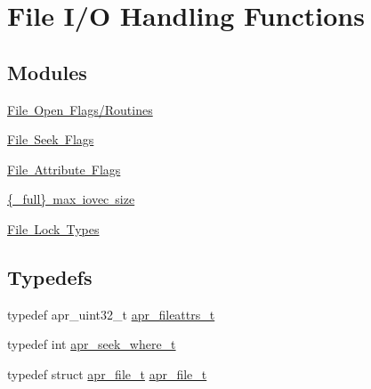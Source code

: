 \hypertarget{group__apr__file__io}{}\section{File I/O Handling Functions}
\label{group__apr__file__io}
\subsection*{Modules}
\begin{DoxyCompactItemize}
\item 
\mbox{\hyperlink{group__apr__file__open__flags}{File Open Flags/\+Routines}}
\item 
\mbox{\hyperlink{group__apr__file__seek__flags}{File Seek Flags}}
\item 
\mbox{\hyperlink{group__apr__file__attrs__set__flags}{File Attribute Flags}}
\item 
\mbox{\hyperlink{group__apr__file__writev}{\{\+\_\+full\} max iovec size}}
\item 
\mbox{\hyperlink{group__apr__file__lock__types}{File Lock Types}}
\end{DoxyCompactItemize}
\subsection*{Typedefs}
\begin{DoxyCompactItemize}
\item 
typedef apr\+\_\+uint32\+\_\+t \mbox{\hyperlink{group__apr__file__io_ga11fbee5a7a3f3d45fff5c31df0db9737}{apr\+\_\+fileattrs\+\_\+t}}
\item 
typedef int \mbox{\hyperlink{group__apr__file__io_ga8eecd44975906042e0e369771802a145}{apr\+\_\+seek\+\_\+where\+\_\+t}}
\item 
typedef struct \mbox{\hyperlink{structapr__file__t}{apr\+\_\+file\+\_\+t}} \mbox{\hyperlink{group__apr__file__io_gaa46e4763ac375ea3c7a43ba6f6099e22}{apr\+\_\+file\+\_\+t}}
\end{DoxyCompactItemize}
